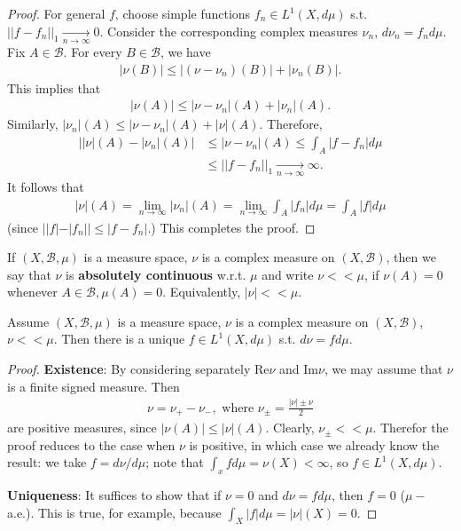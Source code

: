 \begin{proof}
    For general \(f\), choose simple functions \(f_n\in L^1(X,d\mu)\) s.t. \(||f-f_n||_1\xrightarrow[n\rightarrow\infty]{ }0\). Consider the corresponding complex measures \(\nu_n\), \(d\nu_n = f_nd\mu\). Fix \(A\in\mathscr{B}\). For every \(B\in\mathscr{B}\), we have
    \begin{align*}
        |\nu(B)| \leq |(\nu - \nu_n)(B)| + |\nu_n(B)|.
    \end{align*}
    This implies that 
    \begin{align*}
        |\nu(A)| \leq |\nu-\nu_n |(A) + |\nu_n|(A).
    \end{align*}
    Similarly, \(|\nu_n|(A)\leq|\nu-\nu_n|(A) + |\nu|(A)\). Therefore,
    \begin{align*}
        \Big\vert|\nu|(A) - |\nu_n|(A) \Big\vert &\leq |\nu-\nu_n|(A) \leq \int_A |f-f_n|d\mu \\
        &\leq ||f-f_n||_1\xrightarrow[n\rightarrow\infty]{ }\infty.
    \end{align*}
    It follows that
    \begin{align*}
        |\nu|(A) = \lim\limits_{n\rightarrow\infty}|\nu_n|(A) = \lim\limits_{n\rightarrow\infty}\int_A|f_n|d\mu = \int_A|f|d\mu 
    \end{align*}
    (since \(||f|-|f_n|| \leq |f - f_n|\).) This completes the proof.
\end{proof}
\fi
\begin{definition}
    If \((X,\mathscr{B},\mu)\) is a measure space, \(\nu\) is a complex measure on \((X,\mathscr{B})\), then we say that \(\nu\) is \textbf{absolutely continuous} w.r.t. \(\mu\) and write \(\nu<<\mu\), if \(\nu(A)=0\) whenever \(A\in\mathscr{B}, \mu(A)=0\). Equivalently, \(|\nu|<<\mu\).
\end{definition}
\begin{theorem}
    Assume \((X,\mathscr{B}, \mu)\) is a measure space, \(\nu\) is a complex measure on \((X,\mathscr{B})\), \(\nu<<\mu\). Then there is a unique \(f\in L^1(X,d\mu)\) s.t. \(d\nu = fd\mu\).
\end{theorem}
\ifdetailed
\begin{proof}
    \textbf{Existence}: By considering separately Re\(\nu\) and Im\(\nu\), we may assume that \(\nu\) is a finite signed measure. Then 
    \begin{align*}
        \nu = \nu_{+} - \nu_{-}, \text{ where } \nu_{\pm} = \frac{|\nu|\pm\nu}{2}
    \end{align*}
    are positive measures, since \(|\nu(A)| \leq |\nu|(A)\). Clearly, \(\nu_{\pm}<<\mu\). Therefor the proof reduces to the case when \(\nu\) is positive, in which case we already know the result: we take \(f=d\nu/d\mu\); note that \(\int_x fd\mu=\nu(X)<\infty\), so \(f\in L^1(X,d\mu)\).

    \textbf{Uniqueness}: It suffices to show that if \(\nu=0\) and \(d\nu=fd\mu\), then \(f=0\) (\(\mu-\)a.e.). This is true, for example, because \(\int_X|f|d\mu = |\nu|(X)=0\).
\end{proof}
\fi 